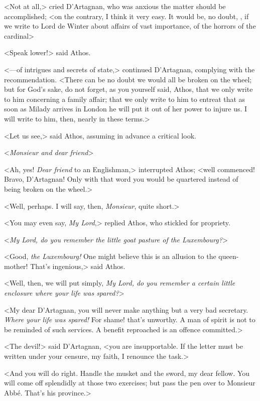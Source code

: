 <Not at all,> cried D'Artagnan, who was anxious the matter should be accomplished; <on the contrary, I think it very easy. It would be, no doubt, , if we write to Lord de Winter about affairs of vast importance, of the horrors of the cardinal\longdash> 

<Speak lower!> said Athos. 

<—of intrigues and secrets of state,> continued D'Artagnan, complying with the recommendation. <There can be no doubt we would all be broken on the wheel; but for God's sake, do not forget, as you yourself said, Athos, that we only write to him concerning a family affair; that we only write to him to entreat that as soon as Milady arrives in London he will put it out of her power to injure us. I will write to him, then, nearly in these terms.> 

<Let us see,> said Athos, assuming in advance a critical look. 

<\textit{Monsieur and dear friend}\longdash> 

<Ah, yes! \textit{Dear friend} to an Englishman,> interrupted Athos; <well commenced! Bravo, D'Artagnan! Only with that word you would be quartered instead of being broken on the wheel.> 

<Well, perhaps. I will say, then, \textit{Monsieur}, quite short.> 

<You may even say, \textit{My Lord},> replied Athos, who stickled for propriety. 

<\textit{My Lord, do you remember the little goat pasture of the Luxembourg?}> 

<Good, \textit{the Luxembourg!} One might believe this is an allusion to the queen-mother! That's ingenious,> said Athos. 

<Well, then, we will put simply, \textit{My Lord, do you remember a certain little enclosure where your life was spared?}>

<My dear D'Artagnan, you will never make anything but a very bad secretary. \textit{Where your life was spared!} For shame! that's unworthy. A man of spirit is not to be reminded of such services. A benefit reproached is an offence committed.> 

<The devil!> said D'Artagnan, <you are insupportable. If the letter must be written under your censure, my faith, I renounce the task.> 

<And you will do right. Handle the musket and the sword, my dear fellow. You will come off splendidly at those two exercises; but pass the pen over to Monsieur Abbé. That's his province.> 

